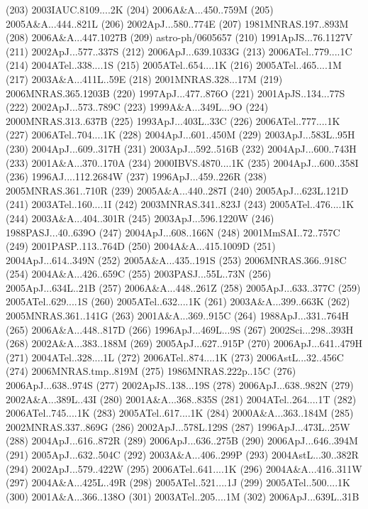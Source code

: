 (203) 2003IAUC.8109....2K
(204) 2006A\&A...450..759M
(205) 2005A\&A...444..821L
(206) 2002ApJ...580..774E
(207) 1981MNRAS.197..893M
(208) 2006A\&A...447.1027B
(209) astro-ph/0605657
(210) 1991ApJS...76.1127V
(211) 2002ApJ...577..337S
(212) 2006ApJ...639.1033G
(213) 2006ATel..779....1C
(214) 2004ATel..338....1S
(215) 2005ATel..654....1K
(216) 2005ATel..465....1M
(217) 2003A\&A...411L..59E
(218) 2001MNRAS.328...17M
(219) 2006MNRAS.365.1203B
(220) 1997ApJ...477..876O
(221) 2001ApJS..134...77S
(222) 2002ApJ...573..789C
(223) 1999A\&A...349L...9O
(224) 2000MNRAS.313..637B
(225) 1993ApJ...403L..33C
(226) 2006ATel..777....1K
(227) 2006ATel..704....1K
(228) 2004ApJ...601..450M
(229) 2003ApJ...583L..95H
(230) 2004ApJ...609..317H
(231) 2003ApJ...592..516B
(232) 2004ApJ...600..743H
(233) 2001A\&A...370..170A
(234) 2000IBVS.4870....1K
(235) 2004ApJ...600..358I
(236) 1996AJ....112.2684W
(237) 1996ApJ...459..226R
(238) 2005MNRAS.361..710R
(239) 2005A\&A...440..287I
(240) 2005ApJ...623L.121D
(241) 2003ATel..160....1I
(242) 2003MNRAS.341..823J
(243) 2005ATel..476....1K
(244) 2003A\&A...404..301R
(245) 2003ApJ...596.1220W
(246) 1988PASJ...40..639O
(247) 2004ApJ...608..166N
(248) 2001MmSAI..72..757C
(249) 2001PASP..113..764D
(250) 2004A\&A...415.1009D
(251) 2004ApJ...614..349N
(252) 2005A\&A...435..191S
(253) 2006MNRAS.366..918C
(254) 2004A\&A...426..659C
(255) 2003PASJ...55L..73N
(256) 2005ApJ...634L..21B
(257) 2006A\&A...448..261Z
(258) 2005ApJ...633..377C
(259) 2005ATel..629....1S
(260) 2005ATel..632....1K
(261) 2003A\&A...399..663K
(262) 2005MNRAS.361..141G
(263) 2001A\&A...369..915C
(264) 1988ApJ...331..764H
(265) 2006A\&A...448..817D
(266) 1996ApJ...469L...9S
(267) 2002Sci...298..393H
(268) 2002A\&A...383..188M
(269) 2005ApJ...627..915P
(270) 2006ApJ...641..479H
(271) 2004ATel..328....1L
(272) 2006ATel..874....1K
(273) 2006AstL...32..456C
(274) 2006MNRAS.tmp..819M
(275) 1986MNRAS.222p..15C
(276) 2006ApJ...638..974S
(277) 2002ApJS..138...19S
(278) 2006ApJ...638..982N
(279) 2002A\&A...389L..43I
(280) 2001A\&A...368..835S
(281) 2004ATel..264....1T
(282) 2006ATel..745....1K
(283) 2005ATel..617....1K
(284) 2000A\&A...363..184M
(285) 2002MNRAS.337..869G
(286) 2002ApJ...578L.129S
(287) 1996ApJ...473L..25W
(288) 2004ApJ...616..872R
(289) 2006ApJ...636..275B
(290) 2006ApJ...646..394M
(291) 2005ApJ...632..504C
(292) 2003A\&A...406..299P
(293) 2004AstL...30..382R
(294) 2002ApJ...579..422W
(295) 2006ATel..641....1K
(296) 2004A\&A...416..311W
(297) 2004A\&A...425L..49R
(298) 2005ATel..521....1J
(299) 2005ATel..500....1K
(300) 2001A\&A...366..138O
(301) 2003ATel..205....1M
(302) 2006ApJ...639L..31B
